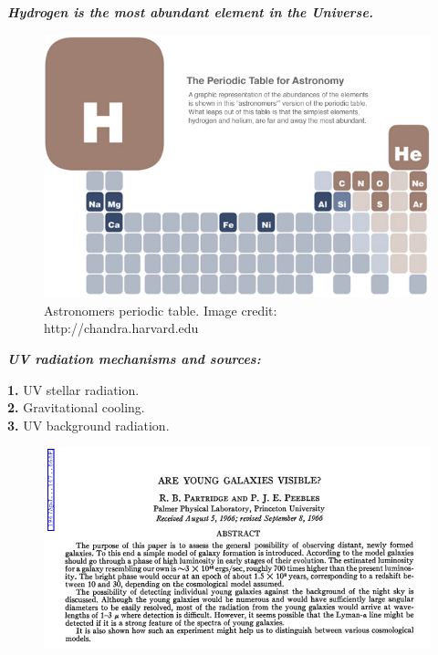 \documentclass{beamer}
\begin{document}
\begin{frame}{\textit{\textbf{Hydrogen is the most abundant element in the Universe.}}} 
\begin{figure}
\includegraphics[scale=0.3]{Figures/astronomy_table.jpg}
\caption{Astronomers periodic table. Image credit: http://chandra.harvard.edu}
\end{figure}
\end{frame}

\begin{frame}{\textit{\textbf{UV radiation mechanisms and sources:}}}

\textbf{1.} UV stellar radiation. \\ 
\textbf{2.} Gravitational cooling. \\
\textbf{3.} UV background radiation.


\end{frame}

\begin{frame}%
\begin{figure}
\includegraphics[scale=0.4]{Figures/PP.png}
\end{figure}
\end{frame}
\end{document}
